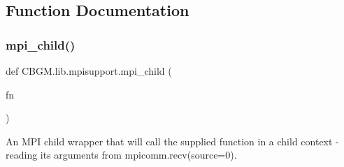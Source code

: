 \subsection{Function Documentation}
\mbox{\label{namespaceCBGM_1_1lib_1_1mpisupport_a83d73a92ab76c25d2d0449d475f5f2ab}} 
\subsubsection{\texorpdfstring{mpi\+\_\+child()}{mpi\_child()}}
{\footnotesize\ttfamily def C\+B\+G\+M.\+lib.\+mpisupport.\+mpi\+\_\+child (\begin{DoxyParamCaption}\item[{}]{fn }\end{DoxyParamCaption})}

\begin{DoxyVerb}An MPI child wrapper that will call the supplied function in a child
context - reading its arguments from mpicomm.recv(source=0).
\end{DoxyVerb}
 